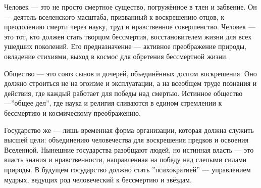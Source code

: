 \documentclass{article}
\begin{document}
Человек — это не просто смертное существо, погружённое в тлен и забвение. 
Он — деятель вселенского масштаба, призванный к воскрешению отцов, 
к преодолению смерти через науку, труд и нравственное совершенство. 
Человек — это тот, кто должен стать творцом бессмертия, восстановителем жизни для всех ушедших поколений. 
Его предназначение — активное преображение природы, овладение стихиями, выход в космос для обретения бессмертной жизни.

Общество — это союз сынов и дочерей, объединённых долгом воскрешения. 
Оно должно строиться не на эгоизме и эксплуатации, а на всеобщем труде познания и действия, 
где каждый работает для победы над смертью. Истинное общество —''общее дел'', 
где наука и религия сливаются в едином стремлении к бессмертию и космическому преображению.

Государство же — лишь временная форма организации, которая должна служить высшей цели: 
объединению человечества для воскрешения предков и освоения Вселенной. 
Нынешние государства разобщают людей, но истинная власть — это власть знания и нравственности, 
направленная на победу над слепыми силами природы. 
В будущем государство должно стать ''психократией'' — управлением мудрых, 
ведущих род человеческий к бессмертию и звёздам.
\end{document}
